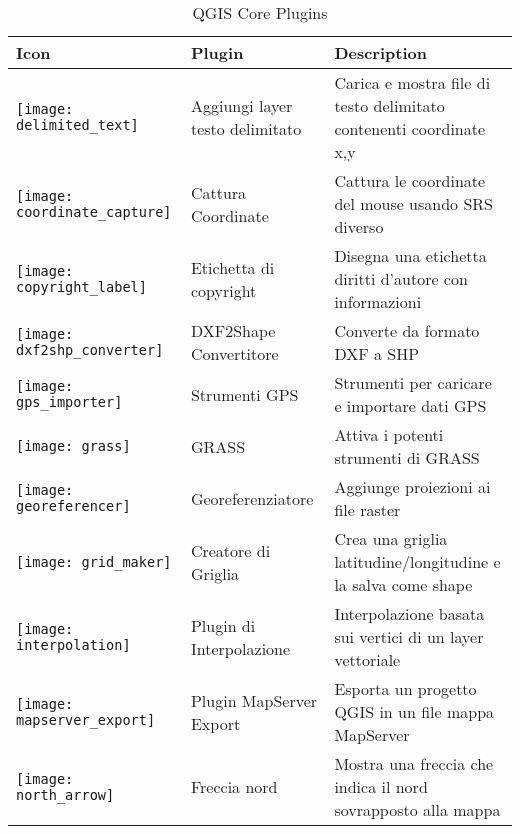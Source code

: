 \begin{minipage}{\textwidth}
\begin{table}[H]
\centering
\caption{QGIS Core Plugins}\label{tab:core_plugins}\medskip
\small
 \begin{tabular}{|l|l|p{4in}|}
\hline \textbf{Icon} & \textbf{Plugin} & \textbf{Description}\\
\hline
\texttt{[image: delimited\_text]}
 & Aggiungi layer testo delimitato \index{plugin!testo delimitato} & Carica e mostra file di testo delimitato contenenti coordinate x,y\\
\hline
\texttt{[image: coordinate\_capture]}
 & Cattura Coordinate \index{plugin!cattura coordinate}& Cattura le coordinate del mouse
usando SRS diverso\\
\hline 
\texttt{[image: copyright\_label]}
 & Etichetta di copyright \index{plugin!etichetta diritti d'autore}& Disegna una etichetta diritti d'autore con informazioni\\
\hline 
\texttt{[image: dxf2shp\_converter]}
 & DXF2Shape Convertitore \index{plugin!convertitore DXF2Shape}& Converte da formato DXF a SHP\\
\hline
\texttt{[image: gps\_importer]}
 & Strumenti GPS \index{plugin!GPS}& Strumenti per caricare e importare dati GPS\\
\hline
\texttt{[image: grass]}
 & GRASS \index{plugin!strumenti GRASS} & Attiva i potenti strumenti di GRASS\\
\hline
\texttt{[image: georeferencer]}
 & Georeferenziatore \index{plugin!georeferenziatore} & Aggiunge proiezioni ai file raster\\
\hline
\texttt{[image: grid\_maker]}
 & Creatore di Griglia \index{plugin!creatore di griglia}& Crea una griglia latitudine/longitudine e la salva come shape\\
\hline
\texttt{[image: interpolation]}
& Plugin di Interpolazione \index{plugin!interpolazione}& Interpolazione basata sui vertici di un layer vettoriale\\
\hline
\texttt{[image: mapserver\_export]}
& Plugin MapServer Export \index{plugin!esportazione verso MapServer}& Esporta un progetto QGIS
in un file mappa MapServer \\
\hline
\texttt{[image: north\_arrow]}
& Freccia nord \index{plugin!freccia nord}& Mostra una freccia che indica il nord sovrapposto alla mappa\\

\end{tabular}
\end{table}
\end{minipage}
